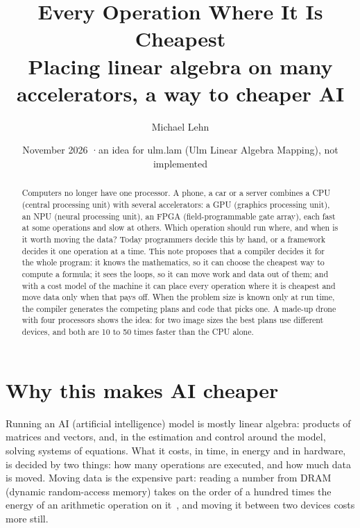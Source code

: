 \documentclass[11pt,a4paper]{article}
\title{Every Operation Where It Is Cheapest\\[0.3ex]
  \large Placing linear algebra on many accelerators, a way to cheaper AI}
\author{Michael Lehn}
\date{November 2026 \enspace·\enspace an idea for ulm.lam (Ulm Linear
  Algebra Mapping), not implemented}
\begin{document}
\maketitle

\begin{abstract}
\noindent Computers no longer have one processor. A phone, a car or a server combines
a CPU (central processing unit) with several accelerators: a GPU (graphics
processing unit), an NPU (neural processing unit), an FPGA (field-programmable
gate array), each fast at some operations and slow at others. Which
operation should run where, and when is it worth moving the data? Today
programmers decide this by hand, or a framework decides it one operation at
a time. This note proposes that a compiler decides it for the whole
program: it knows the mathematics, so it can choose the cheapest way to
compute a formula; it sees the loops, so it can move work and data out of
them; and with a cost model of the machine it can place every operation
where it is cheapest and move data only when that pays off. When the
problem size is known only at run time, the compiler generates the
competing plans and code that picks one. A made-up drone with four
processors shows the idea: for two image sizes the best plans use different
devices, and both are 10 to 50 times faster than the CPU alone.
\end{abstract}

\section{Why this makes AI cheaper}

Running an AI (artificial intelligence) model is mostly linear algebra: products of matrices and
vectors, and, in the estimation and control around the model, solving
systems of equations. What it costs, in time, in energy and in hardware,
is decided by two things: how many operations are executed, and how much
data is moved. Moving data is the expensive part: reading a number from
DRAM (dynamic random-access memory) takes on the order of a hundred times
the energy of an arithmetic operation on it~\cite{horowitz}, and moving it
between two devices costs more still.
\end{document}

